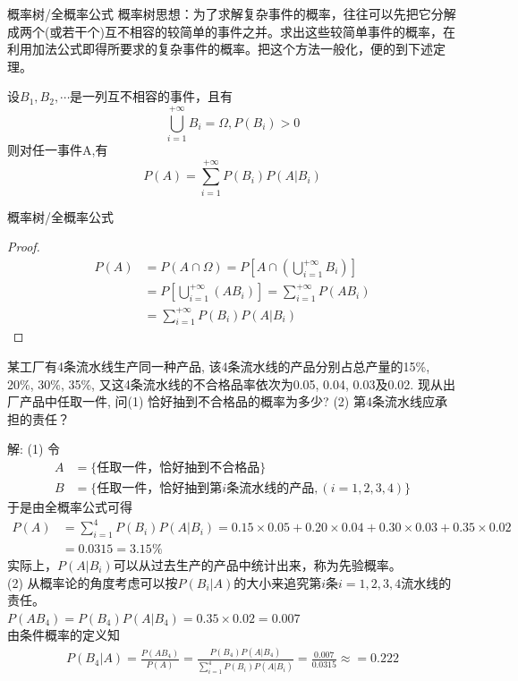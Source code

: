\begin{frame}{概率树/全概率公式}
概率树思想：为了求解复杂事件的概率，往往可以先把它分解成两个(或若干个)互不相容的较简单的事件之并。求出这些较简单事件的概率，在利用加法公式即得所要求的复杂事件的概率。把这个方法一般化，便的到下述定理。
\begin{theorem}
	设$B_1,B_2,\cdots$是一列互不相容的事件，且有
	\[\bigcup_{i=1}^{+\infty}B_i=\Omega,P(B_i)>0 \]
	则对任一事件A,有
	\[P(A)=\sum_{i=1}^{+\infty}P(B_i)P(A|B_i) \]	
\end{theorem}
\end{frame}

\begin{frame}{概率树/全概率公式}
\begin{proof}
	\begin{align*}
	P(A)&=P(A\cap\Omega)=P[A\cap(\bigcup_{i=1}^{+\infty}B_i)]\\
	&=P[\bigcup_{i=1}^{+\infty}(AB_i)]=\sum_{i=1}^{+\infty}P(AB_i)\\
	&=\sum_{i=1}^{+\infty}P(B_i)P(A|B_i)
	\end{align*}
\end{proof}
\end{frame}

\begin{frame}
\begin{example}
	某工厂有4条流水线生产同一种产品, 该4条流水线的产品分别占总产量的15\%, 20\%, 30\%, 35\%, 又这4条流水线的不合格品率依次为0.05, 0.04, 0.03及0.02. 现从出厂产品中任取一件, 问(1) 恰好抽到不合格品的概率为多少? (2) 第4条流水线应承担的责任？
\end{example}
\end{frame}

\begin{frame}[shrink]
解: (1) 令
\begin{align*}
A&=\{\text{任取一件，恰好抽到不合格品} \}\\
B&=\{\text{任取一件，恰好抽到第$i$条流水线的产品}, (i=1,2,3,4) \}
\end{align*}
于是由全概率公式可得
\begin{align*}
P(A)&=\sum\limits_{i=1}^4P(B_i)P(A|B_i)=0.15\times 0.05+0.20\times 0.04+0.30\times 0.03+0.35\times 0.02\\
&=0.0315=3.15\%
\end{align*}
实际上，$P(A|B_i)$可以从过去生产的产品中统计出来，称为先验概率。\\
(2) 从概率论的角度考虑可以按$P(B_i|A)$的大小来追究第$i$条$i=1,2,3,4$流水线的责任。\\
$P(AB_4)=P(B_4)P(A|B_4)=0.35\times 0.02=0.007$\\
由条件概率的定义知
\begin{align*}
P(B_4|A)=\frac{P(AB_4)}{P(A)}=\frac{P(B_4)P(A|B_4)}{\sum\limits_{i=1}^4P(B_i)P(A|B_i)}=\frac{0.007}{0.0315}\approx=0.222
\end{align*}
\end{frame}

